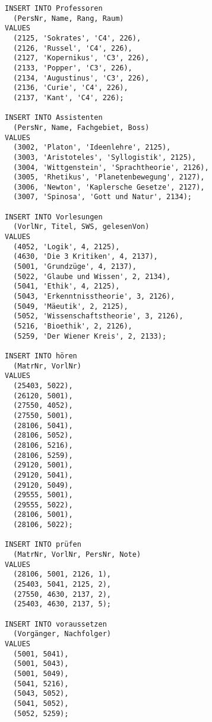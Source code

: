 \documentclass{lehramt-informatik-aufgabe}
\begin{document}
\begin{verbatim}
INSERT INTO Professoren
  (PersNr, Name, Rang, Raum)
VALUES
  (2125, 'Sokrates', 'C4', 226),
  (2126, 'Russel', 'C4', 226),
  (2127, 'Kopernikus', 'C3', 226),
  (2133, 'Popper', 'C3', 226),
  (2134, 'Augustinus', 'C3', 226),
  (2136, 'Curie', 'C4', 226),
  (2137, 'Kant', 'C4', 226);

INSERT INTO Assistenten
  (PersNr, Name, Fachgebiet, Boss)
VALUES
  (3002, 'Platon', 'Ideenlehre', 2125),
  (3003, 'Aristoteles', 'Syllogistik', 2125),
  (3004, 'Wittgenstein', 'Sprachtheorie', 2126),
  (3005, 'Rhetikus', 'Planetenbewegung', 2127),
  (3006, 'Newton', 'Kaplersche Gesetze', 2127),
  (3007, 'Spinosa', 'Gott und Natur', 2134);

INSERT INTO Vorlesungen
  (VorlNr, Titel, SWS, gelesenVon)
VALUES
  (4052, 'Logik', 4, 2125),
  (4630, 'Die 3 Kritiken', 4, 2137),
  (5001, 'Grundzüge', 4, 2137),
  (5022, 'Glaube und Wissen', 2, 2134),
  (5041, 'Ethik', 4, 2125),
  (5043, 'Erkenntnisstheorie', 3, 2126),
  (5049, 'Mäeutik', 2, 2125),
  (5052, 'Wissenschaftstheorie', 3, 2126),
  (5216, 'Bioethik', 2, 2126),
  (5259, 'Der Wiener Kreis', 2, 2133);

INSERT INTO hören
  (MatrNr, VorlNr)
VALUES
  (25403, 5022),
  (26120, 5001),
  (27550, 4052),
  (27550, 5001),
  (28106, 5041),
  (28106, 5052),
  (28106, 5216),
  (28106, 5259),
  (29120, 5001),
  (29120, 5041),
  (29120, 5049),
  (29555, 5001),
  (29555, 5022),
  (28106, 5001),
  (28106, 5022);

INSERT INTO prüfen
  (MatrNr, VorlNr, PersNr, Note)
VALUES
  (28106, 5001, 2126, 1),
  (25403, 5041, 2125, 2),
  (27550, 4630, 2137, 2),
  (25403, 4630, 2137, 5);

INSERT INTO voraussetzen
  (Vorgänger, Nachfolger)
VALUES
  (5001, 5041),
  (5001, 5043),
  (5001, 5049),
  (5041, 5216),
  (5043, 5052),
  (5041, 5052),
  (5052, 5259);
\end{verbatim}
\end{document}
